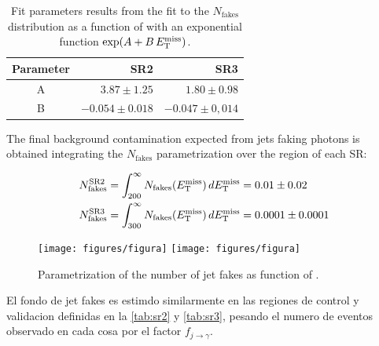 \begin{table}[h!]
  \centering
  \caption{Fit parameters results from the fit to the $N_\text{fakes}$ distribution as a function of \met with an exponential function $\exp(A+B\, E_{\mathrm{T}}^{\mathrm{miss}})$.}
  \begin{tabular}{crr}
    \hline
    Parameter &  SR2 & SR3 \\
     \hline
     A & $3.87 \pm 1.25$  &  $1.80 \pm 0.98$ \\
     B &  $-0.054 \pm 0.018$  & $-0.047 \pm 0,014$ \\
     \hline
  \end{tabular}
  \label{tab:exppars}
\end{table}


The final background contamination expected from jets faking photons is obtained integrating the $N_\text{fakes}$ parametrization over the \met region
of each SR:

\begin{align}
  N_\text{fakes}^\text{SR2} &= \int_{200}^{\infty} N_\text{fakes}(E_{\mathrm{T}}^{\mathrm{miss}}) \, dE_{\mathrm{T}}^{\mathrm{miss}} = 0.01 \pm 0.02 \\
  N_\text{fakes}^\text{SR3} &= \int_{300}^{\infty} N_\text{fakes}(E_{\mathrm{T}}^{\mathrm{miss}}) \, dE_{\mathrm{T}}^{\mathrm{miss}} = 0.0001 \pm 0.0001
\end{align}


\begin{figure}[h]
  \centering
  \texttt{[image: figures/figura]}  \hfill
  \texttt{[image: figures/figura]}
  \caption{Parametrization of the number of jet fakes as function of \met. }
  \label{fig:jetfake_nfakes_met}
\end{figure}

El fondo de jet fakes es estimdo similarmente en las regiones de control
y validacion definidas en la {\tab} \ref{tab:sr2} y \ref{tab:sr3}, pesando
el numero de eventos observado en cada cosa por el factor $f_{j\to\gamma}$. %





